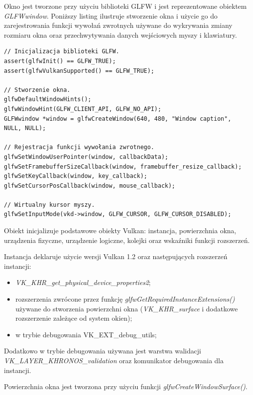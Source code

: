 Okno jest tworzone przy użyciu biblioteki GLFW i jest reprezentowane obiektem \textit{GLFWwindow}.
Poniższy listing ilustruje stworzenie okna i użycie go do zarejestrowania funkcji wywołań zwrotnych używane do wykrywania zmiany rozmiaru okna oraz przechwytywania danych wejściowych myszy i klawiatury.
\lstset{language=C}
\begin{lstlisting}[caption={Użycie biblioteki GLFW do stworzenia okna i rejestracji funkcji wywołań zwrotnich},captionpos=b]
// Inicjalizacja biblioteki GLFW.
assert(glfwInit() == GLFW_TRUE);
assert(glfwVulkanSupported() == GLFW_TRUE);

// Stworzenie okna.
glfwDefaultWindowHints();
glfwWindowHint(GLFW_CLIENT_API, GLFW_NO_API);
GLFWwindow *window = glfwCreateWindow(640, 480, "Window caption", NULL, NULL);

// Rejestracja funkcji wywołania zwrotnego.
glfwSetWindowUserPointer(window, callbackData);
glfwSetFramebufferSizeCallback(window, framebuffer_resize_callback);
glfwSetKeyCallback(window, key_callback);
glfwSetCursorPosCallback(window, mouse_callback);

// Wirtualny kursor myszy.
glfwSetInputMode(vkd->window, GLFW_CURSOR, GLFW_CURSOR_DISABLED);
\end{lstlisting}

Obiekt inicjalizuje podstawowe obiekty Vulkan: instancja, powierzchnia okna, urządzenia fizyczne, urządzenie logiczne, kolejki oraz wskaźniki funkcji rozszerzeń.

Instancja deklaruje użycie wersji Vulkan 1.2 oraz następujących rozszerzeń instancji:
\begin{itemize}
	\item \textit{VK\_KHR\_get\_physical\_device\_properties2};
	\item rozszerzenia zwrócone przez funkcję \textit{glfwGetRequiredInstanceExtensions()} używane do stworzenia powierzchni okna (\textit{VK\_KHR\_surface} i dodatkowe rozszerzenie zależące od system okien);
	\item w trybie debugowania VK\_EXT\_debug\_utils;
\end{itemize}
Dodatkowo w trybie debugowania używana jest warstwa walidacji \textit{VK\_LAYER\_KHRONOS\_validation} oraz komunikator debugowania dla instancji.

Powierzchnia okna jest tworzona przy użyciu funkcji \textit{glfwCreateWindowSurface()}.

